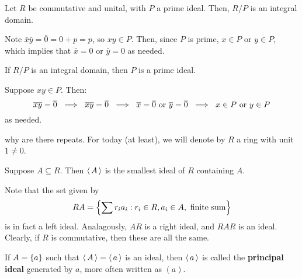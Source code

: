 \begin{thm}
    Let $ R $ be commutative and unital, with $ P $ a prime ideal.
    Then, $ R/P $ is an integral domain.
\end{thm}

\begin{pf}[source=Primary Source Material]
    Note $ \bar{x}\bar{y} = \bar{0} = 0 + p = p $, so $ xy \in P $.
    Then, since $ P $ is prime, $ x \in P $ or $ y \in P $, which implies that
    $ \bar{x} = 0 $ or $ \bar{y} = 0 $ as needed.
\end{pf}

\begin{thm}
    If $ R/P $ is an integral domain, then $ P $ is a prime ideal.
\end{thm}

\begin{pf}[source=Primary Source Material]
    Suppose $ xy \in P $. Then:
    \begin{equation*}
        \oline{xy} = \bar{0} \ \implies \ \bar{x}\bar{y} = \bar{0} \ \implies \
        \bar{x} = \bar{0} \trm{ or } \bar{y} = \bar{0} \ \implies \
        x \in P \trm{ or } y \in P
    \end{equation*}
    as needed.
\end{pf}


why are there repeats.
For today (at least), we will denote by $ R $ a ring with unit $ 1 \neq 0 $.
\begin{defn}
    Suppose $ A \subseteq R $.
    Then $ \operatorname{\langle} A \operatorname{\rangle} $ is the smallest ideal of $ R $ containing $ A $.
\end{defn}

Note that the set given by
\begin{equation*}
    RA = \left\{{\sum r_{i}a_{i} : r_{i} \in R, a_{i} \in A, \textrm{ finite sum}}\right\}
\end{equation*}
is in fact a left ideal.
Analagously, $ AR $ is a right ideal, and $ RAR $ is an ideal.
Clearly, if $ R $ is commutative, then these are all the same.

\begin{defn}
    If $ A = \left\{{a}\right\} $ such that $ \operatorname{\langle} A \operatorname{\rangle} = \operatorname{\langle} a \operatorname{\rangle} $ is an ideal,
    then $ \operatorname{\langle} a \operatorname{\rangle} $ is called the \textbf{principal ideal} generated by $ a $,
    more often written as $ (a) $.
\end{defn}

